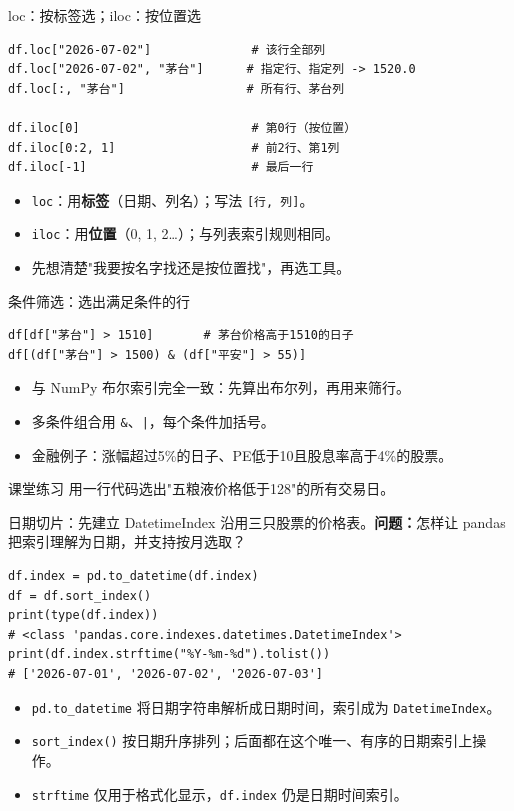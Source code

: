 \documentclass[9pt]{ctexbeamer}
\begin{document}
\begin{frame}[fragile]{loc：按标签选；iloc：按位置选}
	\begin{lstlisting}
df.loc["2026-07-02"]              # 该行全部列
df.loc["2026-07-02", "茅台"]      # 指定行、指定列 -> 1520.0
df.loc[:, "茅台"]                 # 所有行、茅台列

df.iloc[0]                        # 第0行（按位置）
df.iloc[0:2, 1]                   # 前2行、第1列
df.iloc[-1]                       # 最后一行
\end{lstlisting}
	\begin{itemize}
		\item \texttt{loc}：用\textbf{标签}（日期、列名）；写法 \texttt{[行, 列]}。
		\item \texttt{iloc}：用\textbf{位置}（0, 1, 2\ldots）；与列表索引规则相同。
		\item \alert{先想清楚"我要按名字找还是按位置找"，再选工具}。
	\end{itemize}
\end{frame}

\begin{frame}[fragile]{条件筛选：选出满足条件的行}
	\begin{lstlisting}
df[df["茅台"] > 1510]       # 茅台价格高于1510的日子
df[(df["茅台"] > 1500) & (df["平安"] > 55)]
\end{lstlisting}
	\begin{itemize}
		\item 与 NumPy 布尔索引完全一致：先算出布尔列，再用来筛行。
		\item 多条件组合用 \texttt{\&}、\texttt{|}，每个条件加括号。
		\item 金融例子：涨幅超过5\%的日子、PE低于10且股息率高于4\%的股票。
	\end{itemize}
	\begin{exampleblock}{课堂练习}
		用一行代码选出"五粮液价格低于128"的所有交易日。
	\end{exampleblock}
\end{frame}


\begin{frame}[fragile]{日期切片：先建立 DatetimeIndex}
\small 沿用三只股票的价格表。\textbf{问题：}怎样让 pandas 把索引理解为日期，并支持按月选取？
\begin{lstlisting}
df.index = pd.to_datetime(df.index)
df = df.sort_index()
print(type(df.index))
# <class 'pandas.core.indexes.datetimes.DatetimeIndex'>
print(df.index.strftime("%Y-%m-%d").tolist())
# ['2026-07-01', '2026-07-02', '2026-07-03']
\end{lstlisting}
\begin{itemize}
\item \texttt{pd.to\_datetime} 将日期字符串解析成日期时间，索引成为 \texttt{DatetimeIndex}。
\item \texttt{sort\_index()} 按日期升序排列；后面都在这个唯一、有序的日期索引上操作。
\item \texttt{strftime} 仅用于格式化显示，\texttt{df.index} 仍是日期时间索引。
\end{itemize}
\end{frame}
\end{document}
